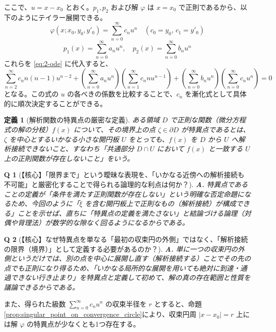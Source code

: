 \documentclass[paper=a4, fontsize=11pt]{jlreq} %
\theoremstyle{break}
\newtheorem{definition}[theorem]{定義}
\theoremstyle{qa}
\newtheorem*{Q}{Q}
\theoremstyle{remark} %
\begin{document}
ここで、$u = x - x_{0}$ とおく。$p_1, p_2$ および解 $\varphi$ は $x=x_0$ で正則であるから、以下のようにテイラー展開できる。
$$
\varphi(x; x_{0}, y_{0}, y'_{0}) = \sum_{n=0}^{\infty} c_{n} u^{n} \quad (c_{0} = y_{0}, \, c_{1} = y'_{0})
$$
$$
p_{1}(x) = \sum_{n=0}^{\infty} a_{n} u^{n}, \quad p_{2}(x) = \sum_{n=0}^{\infty} b_{n} u^{n}
$$
これらを \eqref{eq:2-ode} に代入すると、
$$
\sum_{n=2}^{\infty} c_{n} n(n-1) u^{n-2} + \left( \sum_{n=0}^{\infty} a_{n} u^{n} \right) \left( \sum_{n=1}^{\infty} c_{n} n u^{n-1} \right) + \left( \sum_{n=0}^{\infty} b_{n} u^{n} \right) \left( \sum_{n=0}^{\infty} c_{n} u^{n} \right) = 0
$$
となる。この式の $u$ の各べきの係数を比較することで、$c_n$ を漸化式として具体的に順次決定することができる。

\begin{definition}[解析関数の特異点の厳密な定義]\label{def:singular_point_strict}
    ある領域 $D$ で正則な関数（微分方程式の解の分枝）$f(x)$ について、その境界上の点 $\zeta \in \partial D$ が特異点であるとは、$\zeta$ を中心とするいかなる小さな開円板 $U$ をとっても、$f(x)$ を $D$ から $U$ へ解析接続できないこと、すなわち「共通部分 $D \cap U$ において $f(x)$ と一致する $U$ 上の正則関数が存在しないこと」をいう。
\end{definition}

\begin{Q}[【核心】「限界まで」という曖昧な表現を、「いかなる近傍への解析接続も不可能」と厳密化することで得られる論理的な利点は何か？]
\textbf{A.} 特異点であることの定義が「条件を満たす正則関数が存在しない」という明確な否定命題になるため、今回のように「$\xi$ を含む開円板上で正則なもの（解析接続）が構成できる」ことを示せば、直ちに「特異点の定義を満たさない」と結論づける論理（対偶や背理法）が数学的な隙なく回るようになるからである。
\end{Q}

\begin{Q}[【核心】なぜ特異点を単なる「最初の収束円の外側」ではなく、「解析接続の限界（境界）」として定義する必要があるのか？]
\textbf{A.} 単に一つの収束円の外側というだけでは、別の点を中心に展開し直す（解析接続する）ことでその先の点でも正則になり得るため、「いかなる局所的な展開を用いても絶対に到達・通過できない行き止まり」を特異点と定義して初めて、解の真の存在範囲と性質を議論できるからである。
\end{Q}

また、得られた級数 $\sum_{n=0}^{\infty} c_{n} u^{n}$ の収束半径を $r$ とすると、命題\ref{prop:singular_point_on_convergence_circle}により、収束円周 $|x-x_0|=r$ 上には解 $\varphi$ の特異点が少なくとも1つ存在する。
\end{document}
